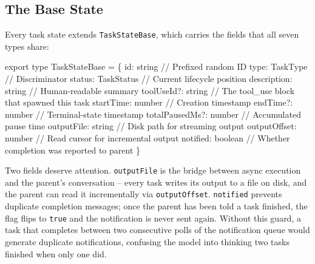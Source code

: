 \documentclass[
  english,
  11pt,
  letterpaper,
]{book}
\newenvironment{Shaded}{\begin{snugshade}}{\end{snugshade}}
\newcommand{\CommentTok}[1]{\textcolor[rgb]{0.37,0.37,0.37}{#1}}
\newcommand{\DataTypeTok}[1]{\textcolor[rgb]{0.68,0.00,0.00}{#1}}
\newcommand{\ImportTok}[1]{\textcolor[rgb]{0.00,0.46,0.62}{#1}}
\newcommand{\NormalTok}[1]{\textcolor[rgb]{0.00,0.23,0.31}{#1}}
\newcommand{\OperatorTok}[1]{\textcolor[rgb]{0.37,0.37,0.37}{#1}}
\begin{document}
\subsection{The Base State}\label{the-base-state}

Every task state extends \texttt{TaskStateBase}, which carries the
fields that all seven types share:

\begin{Shaded}
\begin{Highlighting}[]
\ImportTok{export type}\NormalTok{ TaskStateBase }\OperatorTok{=}\NormalTok{ \{}
\NormalTok{  id}\OperatorTok{:} \DataTypeTok{string}              \CommentTok{// Prefixed random ID}
\NormalTok{  type}\OperatorTok{:}\NormalTok{ TaskType          }\CommentTok{// Discriminator}
\NormalTok{  status}\OperatorTok{:}\NormalTok{ TaskStatus      }\CommentTok{// Current lifecycle position}
\NormalTok{  description}\OperatorTok{:} \DataTypeTok{string}     \CommentTok{// Human{-}readable summary}
\NormalTok{  toolUseId}\OperatorTok{?:} \DataTypeTok{string}      \CommentTok{// The tool\_use block that spawned this task}
\NormalTok{  startTime}\OperatorTok{:} \DataTypeTok{number}       \CommentTok{// Creation timestamp}
\NormalTok{  endTime}\OperatorTok{?:} \DataTypeTok{number}        \CommentTok{// Terminal{-}state timestamp}
\NormalTok{  totalPausedMs}\OperatorTok{?:} \DataTypeTok{number}  \CommentTok{// Accumulated pause time}
\NormalTok{  outputFile}\OperatorTok{:} \DataTypeTok{string}      \CommentTok{// Disk path for streaming output}
\NormalTok{  outputOffset}\OperatorTok{:} \DataTypeTok{number}    \CommentTok{// Read cursor for incremental output}
\NormalTok{  notified}\OperatorTok{:} \DataTypeTok{boolean}       \CommentTok{// Whether completion was reported to parent}
\NormalTok{\}}
\end{Highlighting}
\end{Shaded}

Two fields deserve attention. \texttt{outputFile} is the bridge between
async execution and the parent's conversation -- every task writes its
output to a file on disk, and the parent can read it incrementally via
\texttt{outputOffset}. \texttt{notified} prevents duplicate completion
messages; once the parent has been told a task finished, the flag flips
to \texttt{true} and the notification is never sent again. Without this
guard, a task that completes between two consecutive polls of the
notification queue would generate duplicate notifications, confusing the
model into thinking two tasks finished when only one did.
\end{document}
